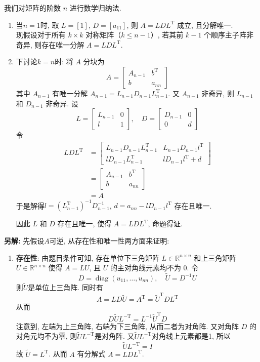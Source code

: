 \documentclass[12pt, answers]{exam}     %
\newcommand{\anothersolution}{\par\noindent\textbf{另解:}}
\newcommand{\R}{\mathbb{R}}
\newcommand{\T}{\mathrm{T}}
\begin{document}
\begin{questions}
\begin{solution}
我们对矩阵的阶数 \( n \) 进行数学归纳法. 
\begin{enumerate}
\item 当$n = 1$时, 取 \( L = [1] \), \( D = [a_{11}] \), 则 \( A = LDL^{\T} \) 成立, 且分解唯一. 
\\ 现假设对于所有 \( k \times k \) 对称矩阵（\( k \leq n-1 \)）, 若其前 \( k-1 \) 个顺序主子阵非奇异, 则存在唯一分解 \( A = LDL^{\T} \).
\item 下讨论\( k = n \)时: 
将 \( A \) 分块为
\[
A = \begin{bmatrix}
    A_{n-1} & b^{\T} \\
    b & a_{nn}
\end{bmatrix}
\]
其中 \( A_{n-1} \) 有唯一分解 \( A_{n-1} = L_{n-1}D_{n-1}L_{n-1}^{\T} \). 
又 \( A_{n-1} \) 非奇异, 则 \( L_{n-1} \) 和 \( D_{n-1} \) 非奇异. 设
\[
L = \begin{bmatrix}
    L_{n-1} & 0 \\
    l & 1
\end{bmatrix}, \quad
D = \begin{bmatrix}
    D_{n-1} & 0 \\
    0 & d
\end{bmatrix}
\]
令
\begin{align*}
LDL^{\T} &= \begin{bmatrix}
    L_{n-1} D_{n-1} L_{n-1}^{\T} & L_{n-1} D_{n-1} l^{\T} \\
    l D_{n-1} L_{n-1}^{\T} & l D_{n-1} l^{\T} + d
\end{bmatrix} \\
&= \begin{bmatrix}
    A_{n-1} & b^{\T} \\
    b & a_{nn}
\end{bmatrix} \\
&= A
\end{align*}
于是解得\( l = (L_{n-1}^{\T})^{-1} D_{n-1}^{-1} \), \( d = a_{nn} - l D_{n-1} l^{\T} \) 存在且唯一.

因此 \( L \) 和 \( D \) 存在且唯一, 使得 \( A = LDL^{\T} \), 命题得证. 
\end{enumerate} 
\anothersolution{}
先假设$A$可逆, 从存在性和唯一性两方面来证明:
\begin{enumerate}
    \item \textbf{存在性}: 
    由题目条件可知, 存在单位下三角矩阵 \( L \in \R^{n \times n} \) 和上三角矩阵 \( U \in \R^{n \times n} \) 使得 \( A = LU \), 且 \( U \) 的主对角线元素均不为 0. 令
    \[
    D = \operatorname{diag}(u_{11}, \ldots, u_{nn}), \quad \widetilde{U} = D^{-1}U
    \]
    则$\widetilde{U}$是单位上三角阵. 同时有
    \[
    A = L D \widetilde{U} = A^{\T} = \widetilde{U}^{\T} D L^{\T}    
    \]
    从而
    \[
    D \widetilde{U} L^{-\T} = L^{-1} \widetilde{U}^{\T} D
    \]
    注意到, 左端为上三角阵, 右端为下三角阵, 从而二者为对角阵. 又对角阵 \( D \) 的对角元均不为零, 则$\widetilde{U}L^{-\T}$是对角阵. 又$\widetilde{U}L^{-\T}$对角线上元素都是1, 所以
    \[
    \widetilde{U} L^{-\T} = I
    \]
    故 \( \widetilde{U} = L^{\T} \). 从而 \( A \) 有分解式 \( A = LDL^{\T} \). 


\end{enumerate}
\end{solution}
\end{questions}
\end{document}
